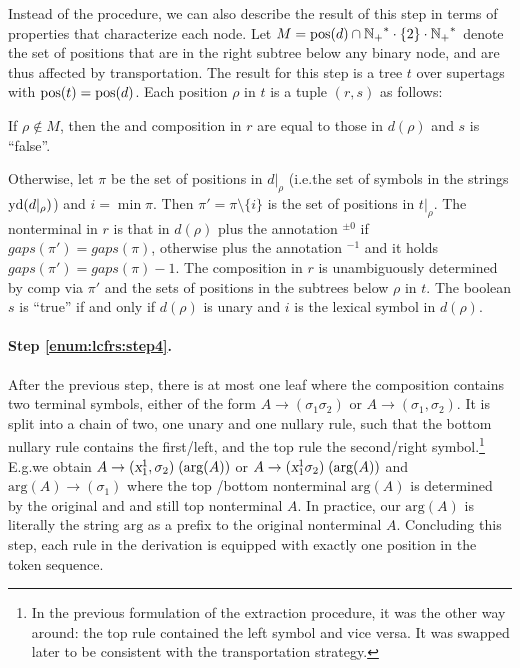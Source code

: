 \documentclass[../../document.tex]{subfiles}
\begin{document}
    Instead of the procedure, we can also describe the result of this step in terms of properties that characterize each node.
    Let \(M = \operatorname{pos}(d) \cap {\ensuremath{\mathbb{N}}_+}^* \cdot \{2\} \cdot {\ensuremath{\mathbb{N}}_+}^*\) denote the set of positions that are in the right subtree below any binary node, and are thus affected by transportation.
    The result for this step is a tree \(t\) over  supertags with \(\operatorname{pos}(t) = \operatorname{pos}(d)\).
    Each position \(\rho\) in \(t\) is a tuple \((r, s)\) as follows:
    \begin{compactitem}
        \item If \(\rho \notin M\), then the  and composition in \(r\) are equal to those in \(d(\rho)\) and \(s\) is ``false''.
        \item
            Otherwise, let \(\pi\) be the set of positions in \(d|_\rho\) (i.e.\@ the set of symbols in the strings \(\operatorname{yd}(d|_\rho)\)) and \(i = \min \pi\).
            Then \(\pi' = \pi \setminus \{i\}\) is the set of positions in \(t|_\rho\).
            The  nonterminal in \(r\) is that in \(d(\rho)\) plus the annotation \(^{\pm 0}\) if \(gaps(\pi') = gaps(\pi)\), otherwise plus the annotation \(^{-1}\) and it holds \(gaps(\pi') = gaps(\pi)-1\).
            The composition in \(r\) is unambiguously determined by \(\mathrm{comp}\) via \(\pi'\) and the sets of positions in the subtrees below \(\rho\) in \(t\).
            The boolean \(s\) is ``true'' if and only if \(d(\rho)\) is unary and \(i\) is the lexical symbol in \(d(\rho)\).
    \end{compactitem}


    \paragraph{Step \ref{enum:lcfrs:step4}.}
    After the previous step, there is at most one leaf where the  composition contains two terminal symbols, either of the form \(A \to (\sigma_1 \sigma_2)\) or \(A \to (\sigma_1, \sigma_2)\).
    It is split into a chain of two, one unary and one nullary rule, such that the bottom nullary rule contains the first/left, and the top rule the second/right symbol.\footnote{
        In the previous formulation of the extraction procedure, it was the other way around: the top rule contained the left symbol and vice versa.
        It was swapped later to be consistent with the transportation strategy.
    }
    E.g.\@ we obtain \(A \to (\textsl{x}_1^1, \sigma_2)\;(\text{arg}(A))\) or \(A \to (\textsl{x}_1^1 \sigma_2)\;(\text{arg}(A))\) and \(\text{arg}(A) \to (\sigma_1)\) where the top /bottom  nonterminal \(\text{arg}(A)\) is determined by the original and and still top  nonterminal \(A\).
    In practice, our \(\text{arg}(A)\) is literally the string \(\text{arg}\) as a prefix to the original nonterminal \(A\).
    Concluding this step, each rule in the derivation is equipped with exactly one position in the token sequence.
\end{document}
